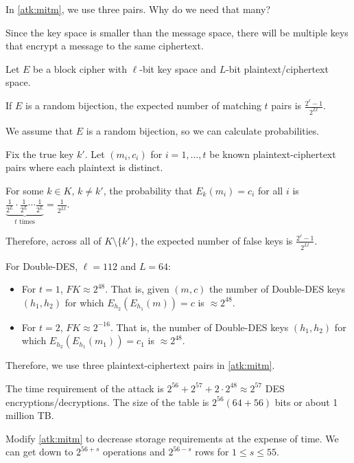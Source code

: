\documentclass[class=co487,tikz,minted,notes]{agony}
\begin{document}
In \cref{atk:mitm}, we use three pairs. Why do we need that many?

Since the key space is smaller than the message space,
there will be multiple keys that encrypt a message to the same ciphertext.

\begin{lemma}
  Let $E$ be a block cipher with $\ell$-bit key space
  and $L$-bit plaintext/ciphertext space.

  If $E$ is a random bijection, the expected number of
   matching $t$ pairs is $\frac{2^\ell-1}{2^{Lt}}$.
\end{lemma}
\begin{prf}
  We assume that $E$ is a random bijection, so we can calculate probabilities.

  Fix the true key $k'$.
  Let $(m_i,c_i)$ for $i = 1,\dotsc,t$ be known plaintext-ciphertext pairs
  where each plaintext is distinct.

  For some $k \in K$, $k \neq k'$, the probability that $E_k(m_i) = c_i$
  for all $i$ is $\underbrace{\frac{1}{2^L}\cdot\frac{1}{2^L}\cdots\frac{1}{2^L}}_{\text{$t$ times}} = \frac{1}{2^{Lt}}$.

  Therefore, across all of $K \setminus \{k'\}$,
  the expected number of false keys is $\frac{2^\ell-1}{2^{Lt}}$.
\end{prf}

For Double-DES, $\ell = 112$ and $L = 64$:
\begin{itemize}
  \item For $t=1$, $FK \approx 2^{48}$.
        That is, given $(m,c)$ the number of Double-DES keys $(h_1,h_2)$
        for which $E_{h_2}(E_{h_1}(m)) = c$ is $\approx 2^{48}$.
  \item For $t=2$, $FK \approx 2^{-16}$.
        That is, the number of Double-DES keys $(h_1,h_2)$
        for which $E_{h_2}(E_{h_1}(m_1)) = c_1$ is $\approx 2^{48}$.
\end{itemize}

Therefore, we use three plaintext-ciphertext pairs in \cref{atk:mitm}.

The time requirement of the attack is $2^{56} + 2^{57} + 2 \cdot 2^{48} \approx 2^{57}$
DES encryptions/decryptions.
The size of the table is $2^{56}(64+56)$ bits or about 1 million TB.

\begin{xca}
  Modify \cref{atk:mitm} to decrease storage requirements at the expense of time.
  We can get down to $2^{56+s}$ operations and $2^{56-s}$ rows
  for $1 \leq s \leq 55$.
\end{xca}
\end{document}
